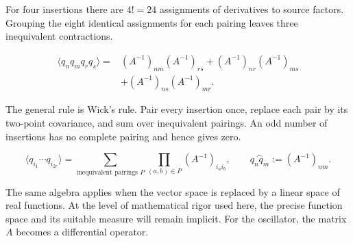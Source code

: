 For four insertions there are $4!=24$ assignments of derivatives to source
factors.  Grouping the eight identical assignments for each pairing leaves
three inequivalent contractions.

\begin{align}
  \langle q_nq_mq_rq_s\rangle
  ={}&(A^{-1})_{nm}(A^{-1})_{rs}
  +(A^{-1})_{nr}(A^{-1})_{ms}
  \nonumber\\
  &+(A^{-1})_{ns}(A^{-1})_{mr}.
  \label{eq:proposal-four-point-gaussian}
\end{align}

The general rule is Wick's rule.  Pair every insertion once, replace each pair
by its two-point covariance, and sum over inequivalent pairings.  An odd number
of insertions has no complete pairing and hence gives zero.

\begin{equation}
  \langle q_{i_1}\cdots q_{i_{2r}}\rangle
  =\sum_{\text{inequivalent pairings }P}
  \prod_{(a,b)\in P}(A^{-1})_{i_ai_b},
  \qquad
  \overset{\frown}{q_nq_m}:=(A^{-1})_{nm}.
  \label{eq:proposal-wick-rule}
\end{equation}

The same algebra applies when the vector space is replaced by a linear space of
real functions.  At the level of mathematical rigor used here, the precise
function space and its suitable measure will remain implicit.  For the
oscillator, the matrix $A$ becomes a differential operator.


